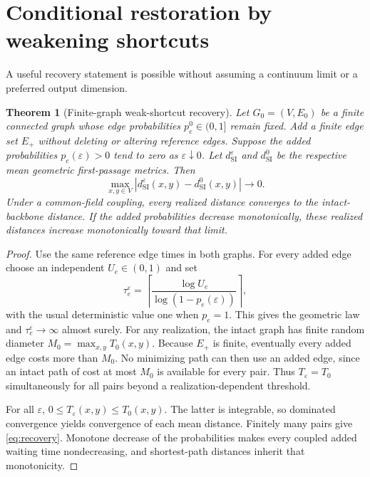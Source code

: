 \documentclass[11pt,letterpaper]{article}
\newtheorem{theorem}{Theorem}[section]
\theoremstyle{definition}
\theoremstyle{remark}
\newcommand{\dSI}{d_{\mathrm{SI}}}
\begin{document}
\section{Conditional restoration by weakening shortcuts}\label{sec:recovery}
A useful recovery statement is possible without assuming a continuum limit or a preferred output dimension.
\begin{theorem}[Finite-graph weak-shortcut recovery]\label{thm:recovery}
Let $G_0=(V,E_0)$ be a finite connected graph whose edge probabilities $p_e^0\in(0,1]$ remain fixed. Add a finite edge set $E_+$ without deleting or altering reference edges. Suppose the added probabilities $p_e(\varepsilon)>0$ tend to zero as $\varepsilon\downarrow0$. Let $\dSI^\varepsilon$ and $\dSI^0$ be the respective mean geometric first-passage metrics. Then
\begin{equation}
 \max_{x,y\in V}\left|\dSI^\varepsilon(x,y)-\dSI^0(x,y)\right|\longrightarrow0.
 \label{eq:recovery}
\end{equation}
Under a common-field coupling, every realized distance converges to the intact-backbone distance. If the added probabilities decrease monotonically, these realized distances increase monotonically toward that limit.
\end{theorem}
\begin{proof}
Use the same reference edge times in both graphs. For every added edge choose an independent $U_e\in(0,1)$ and set
\begin{equation}
 \tau_e^\varepsilon=\left\lceil
 \frac{\log U_e}{\log(1-p_e(\varepsilon))}\right\rceil,
 \label{eq:coupling}
\end{equation}
with the usual deterministic value one when $p_e=1$. This gives the geometric law and $\tau_e^\varepsilon\to\infty$ almost surely. For any realization, the intact graph has finite random diameter $M_0=\max_{x,y}T_0(x,y)$. Because $E_+$ is finite, eventually every added edge costs more than $M_0$. No minimizing path can then use an added edge, since an intact path of cost at most $M_0$ is available for every pair. Thus $T_\varepsilon=T_0$ simultaneously for all pairs beyond a realization-dependent threshold.

For all $\varepsilon$, $0\leq T_\varepsilon(x,y)\leq T_0(x,y)$. The latter is integrable, so dominated convergence yields convergence of each mean distance. Finitely many pairs give \eqref{eq:recovery}. Monotone decrease of the probabilities makes every coupled added waiting time nondecreasing, and shortest-path distances inherit that monotonicity.
\end{proof}
\end{document}
